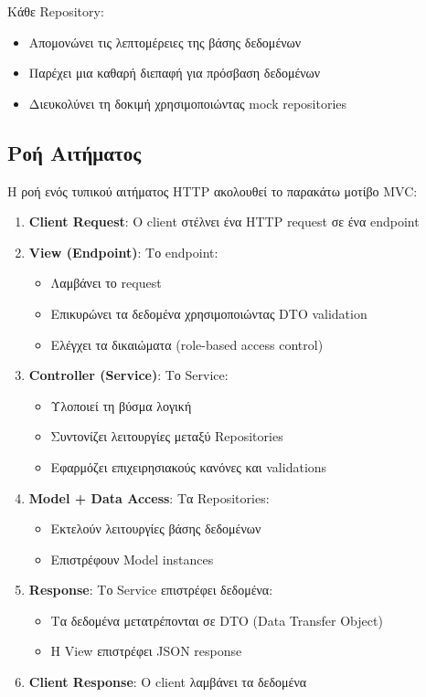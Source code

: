 \documentclass[12pt,a4paper]{report}
\begin{document}
Κάθε Repository:
\begin{itemize}
    \item Απομονώνει τις λεπτομέρειες της βάσης δεδομένων
    \item Παρέχει μια καθαρή διεπαφή για πρόσβαση δεδομένων
    \item Διευκολύνει τη δοκιμή χρησιμοποιώντας mock repositories
\end{itemize}

\subsection{Ροή Αιτήματος}

Η ροή ενός τυπικού αιτήματος HTTP ακολουθεί το παρακάτω μοτίβο MVC:

\begin{enumerate}
    \item \textbf{Client Request}: Ο client στέλνει ένα HTTP request σε ένα endpoint

    \item \textbf{View (Endpoint)}: Το endpoint:
    \begin{itemize}
        \item Λαμβάνει το request
        \item Επικυρώνει τα δεδομένα χρησιμοποιώντας DTO validation
        \item Ελέγχει τα δικαιώματα (role-based access control)
    \end{itemize}

    \item \textbf{Controller (Service)}: Το Service:
    \begin{itemize}
        \item Υλοποιεί τη βύσμα λογική
        \item Συντονίζει λειτουργίες μεταξύ Repositories
        \item Εφαρμόζει επιχειρησιακούς κανόνες και validations
    \end{itemize}

    \item \textbf{Model + Data Access}: Τα Repositories:
    \begin{itemize}
        \item Εκτελούν λειτουργίες βάσης δεδομένων
        \item Επιστρέφουν Model instances
    \end{itemize}

    \item \textbf{Response}: Το Service επιστρέφει δεδομένα:
    \begin{itemize}
        \item Τα δεδομένα μετατρέπονται σε DTO (Data Transfer Object)
        \item Η View επιστρέφει JSON response
    \end{itemize}

    \item \textbf{Client Response}: Ο client λαμβάνει τα δεδομένα
\end{enumerate}
\end{document}
